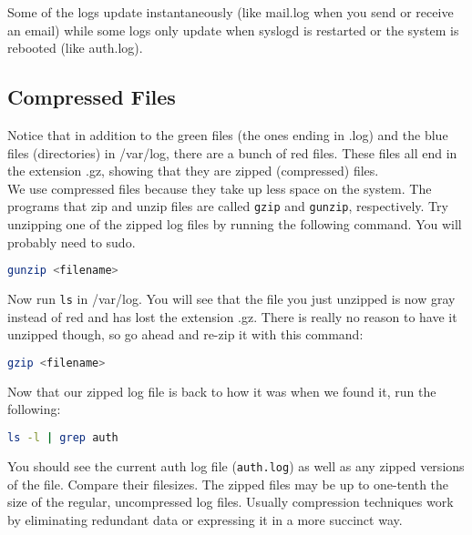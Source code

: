 \documentclass{article}
\begin{document}
Some of the logs update instantaneously (like mail.log when you send or receive an email) while some logs only update when syslogd is restarted or the system is rebooted (like auth.log).


\subsection*{Compressed Files}

\indent\indent Notice that in addition to the green files (the ones ending in .log) and the blue files (directories) in /var/log, there are a bunch of red files. These files all end in the extension .gz, showing that they are zipped (compressed) files. \\

We use compressed files because they take up less space on the system. The programs that zip and unzip files are called \verb|gzip| and \verb|gunzip|, respectively. Try unzipping one of the zipped log files by running the following command. You will probably need to sudo.

\begin{lstlisting}[basicstyle=\ttfamily, backgroundcolor = \color{lightgray}, language = bash, xleftmargin = 0cm, framexleftmargin = 1em]
gunzip <filename>
\end{lstlisting}

Now run \verb|ls| in /var/log. You will see that the file you just unzipped is now gray instead of red and has lost the extension .gz. There is really no reason to have it unzipped though, so go ahead and re-zip it with this command:

\begin{lstlisting}[basicstyle=\ttfamily, backgroundcolor = \color{lightgray}, language = bash, xleftmargin = 0cm, framexleftmargin = 1em]
gzip <filename>
\end{lstlisting}

Now that our zipped log file is back to how it was when we found it, run the following:

\begin{lstlisting}[basicstyle=\ttfamily, backgroundcolor = \color{lightgray}, language = bash, xleftmargin = 0cm, framexleftmargin = 1em]
ls -l | grep auth
\end{lstlisting}

You should see the current auth log file (\verb|auth.log|) as well as any zipped versions of the file. Compare their filesizes. The zipped files may be up to one-tenth the size of the regular, uncompressed log files. Usually compression techniques work by eliminating redundant data or expressing it in a more succinct way. \\
\end{document}
